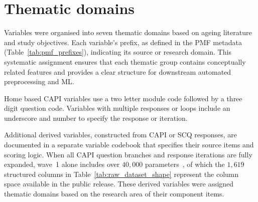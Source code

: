 \section{Thematic domains}\label{sc:thematic_domains}
Variables were organised into seven thematic domains based on ageing literature and study objectives. Each variable's prefix, as defined in the \gls{PMF} metadata (Table~\ref{tab:pmf_prefixes}), indicating its source or research domain. This systematic assignment ensures that each thematic group contains conceptually related features and provides a clear structure for downstream automated preprocessing and \gls{ML}. 

Home based \gls{CAPI} variables use a two letter module code followed by a three digit question code. Variables with multiple responses or loops include an underscore and number to specify the response or iteration.

Additional derived variables, constructed from \gls{CAPI} or \gls{SCQ} responses, are documented in a separate variable codebook that specifies their source items and scoring logic. When all \gls{CAPI} question branches and response iterations are fully expanded, wave~1 alone includes over $40,000$ parameters~\cite{xuTailoredMachineLearning2023}, of which the $1,619$ structured columns in Table~\ref{tab:raw_dataset_shape} represent the column space available in the public release. These derived variables were assigned thematic domains based on the research area of their component items.


